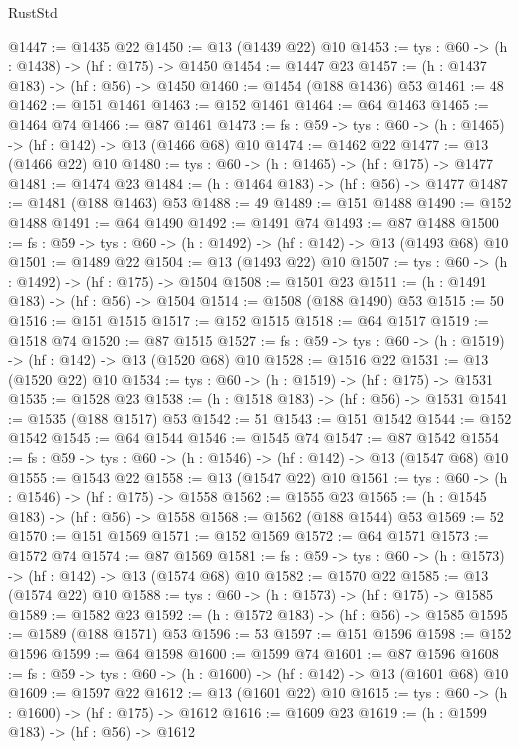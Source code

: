 \begin{lexlean}{RustStd}
\begin{coremodule}
@1447 := @1435 @22
@1450 := @13 (@1439 @22) @10
@1453 := {tys : @60} -> (h : @1438) -> (hf : @175) -> @1450
@1454 := @1447 @23
@1457 := (h : @1437 @183) -> (hf : @56) -> @1450
@1460 := @1454 (@188 @1436) @53
@1461 := 48
@1462 := @151 @1461
@1463 := @152 @1461
@1464 := @64 @1463
@1465 := @1464 @74
@1466 := @87 @1461
@1473 := {fs : @59} -> {tys : @60} -> (h : @1465) -> (hf : @142) -> @13 (@1466 @68) @10
@1474 := @1462 @22
@1477 := @13 (@1466 @22) @10
@1480 := {tys : @60} -> (h : @1465) -> (hf : @175) -> @1477
@1481 := @1474 @23
@1484 := (h : @1464 @183) -> (hf : @56) -> @1477
@1487 := @1481 (@188 @1463) @53
@1488 := 49
@1489 := @151 @1488
@1490 := @152 @1488
@1491 := @64 @1490
@1492 := @1491 @74
@1493 := @87 @1488
@1500 := {fs : @59} -> {tys : @60} -> (h : @1492) -> (hf : @142) -> @13 (@1493 @68) @10
@1501 := @1489 @22
@1504 := @13 (@1493 @22) @10
@1507 := {tys : @60} -> (h : @1492) -> (hf : @175) -> @1504
@1508 := @1501 @23
@1511 := (h : @1491 @183) -> (hf : @56) -> @1504
@1514 := @1508 (@188 @1490) @53
@1515 := 50
@1516 := @151 @1515
@1517 := @152 @1515
@1518 := @64 @1517
@1519 := @1518 @74
@1520 := @87 @1515
@1527 := {fs : @59} -> {tys : @60} -> (h : @1519) -> (hf : @142) -> @13 (@1520 @68) @10
@1528 := @1516 @22
@1531 := @13 (@1520 @22) @10
@1534 := {tys : @60} -> (h : @1519) -> (hf : @175) -> @1531
@1535 := @1528 @23
@1538 := (h : @1518 @183) -> (hf : @56) -> @1531
@1541 := @1535 (@188 @1517) @53
@1542 := 51
@1543 := @151 @1542
@1544 := @152 @1542
@1545 := @64 @1544
@1546 := @1545 @74
@1547 := @87 @1542
@1554 := {fs : @59} -> {tys : @60} -> (h : @1546) -> (hf : @142) -> @13 (@1547 @68) @10
@1555 := @1543 @22
@1558 := @13 (@1547 @22) @10
@1561 := {tys : @60} -> (h : @1546) -> (hf : @175) -> @1558
@1562 := @1555 @23
@1565 := (h : @1545 @183) -> (hf : @56) -> @1558
@1568 := @1562 (@188 @1544) @53
@1569 := 52
@1570 := @151 @1569
@1571 := @152 @1569
@1572 := @64 @1571
@1573 := @1572 @74
@1574 := @87 @1569
@1581 := {fs : @59} -> {tys : @60} -> (h : @1573) -> (hf : @142) -> @13 (@1574 @68) @10
@1582 := @1570 @22
@1585 := @13 (@1574 @22) @10
@1588 := {tys : @60} -> (h : @1573) -> (hf : @175) -> @1585
@1589 := @1582 @23
@1592 := (h : @1572 @183) -> (hf : @56) -> @1585
@1595 := @1589 (@188 @1571) @53
@1596 := 53
@1597 := @151 @1596
@1598 := @152 @1596
@1599 := @64 @1598
@1600 := @1599 @74
@1601 := @87 @1596
@1608 := {fs : @59} -> {tys : @60} -> (h : @1600) -> (hf : @142) -> @13 (@1601 @68) @10
@1609 := @1597 @22
@1612 := @13 (@1601 @22) @10
@1615 := {tys : @60} -> (h : @1600) -> (hf : @175) -> @1612
@1616 := @1609 @23
@1619 := (h : @1599 @183) -> (hf : @56) -> @1612

\end{coremodule}
\end{lexlean}
